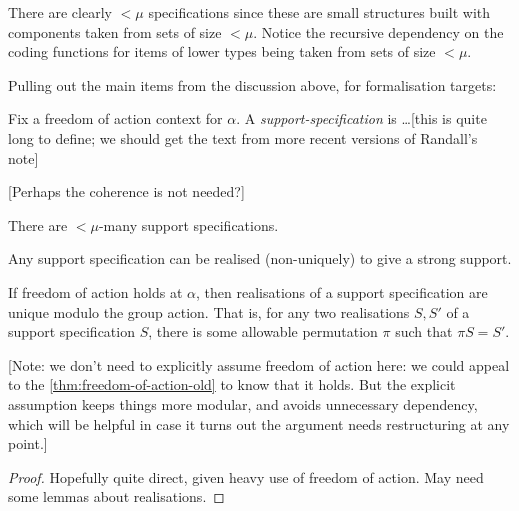 There are clearly $<\mu$ specifications since these are small structures built with components taken from sets of size $<\mu$.  Notice the recursive dependency on the coding functions for items of lower types being taken from sets of size $<\mu$.

Pulling out the main items from the discussion above, for formalisation targets:

\begin{definition}
  \label{def:support-spec}
  Fix a freedom of action context for $\alpha$.  A \emph{support-specification} is \ldots [this is quite long to define; we should get the text from more recent versions of Randall’s note]

  [Perhaps the coherence is not needed?]
\end{definition}

\begin{lemma}
  \label{lem:count-support-specs}
  There are $<\mu$-many support specifications.
\end{lemma}

\begin{definition}
  \label{def:support-spec-realisation}
  Any support specification can be realised (non-uniquely) to give a strong support.
\end{definition}

\begin{lemma}
  \label{lem:support-spec-realisation-unique}
  If freedom of action holds at $\alpha$, then realisations of a support specification are unique modulo the group action.  That is, for any two realisations $S, S'$ of a support specification $S$, there is some allowable permutation $\pi$ such that $\pi S = S'$.

  [Note: we don’t need to explicitly assume freedom of action here: we could appeal to the \cref{thm:freedom-of-action-old} to know that it holds.  But the explicit assumption keeps things more modular, and avoids unnecessary dependency, which will be helpful in case it turns out the argument needs restructuring at any point.]
\end{lemma}

\begin{proof}
  Hopefully quite direct, given heavy use of freedom of action.  May need some lemmas about realisations.
\end{proof}

